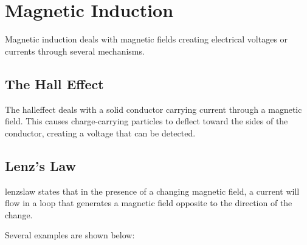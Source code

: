 \chapter{Magnetic Induction} \label{chap:MagneticInduction}
Magnetic induction deals with magnetic fields creating electrical voltages or currents through several mechanisms.  

	\section{The Hall Effect}
	The \gls{halleffect} deals with a solid conductor carrying current through a magnetic field.  This causes charge-carrying particles to deflect toward the sides of the conductor, creating a voltage that can be detected.  
	
	
	\section{Lenz's Law}
	
	\gls{lenzslaw} states that in the presence of a changing magnetic field, a current will flow in a loop that generates a magnetic field opposite to the direction of the change.  
	
	
	Several examples are shown below: 
	
